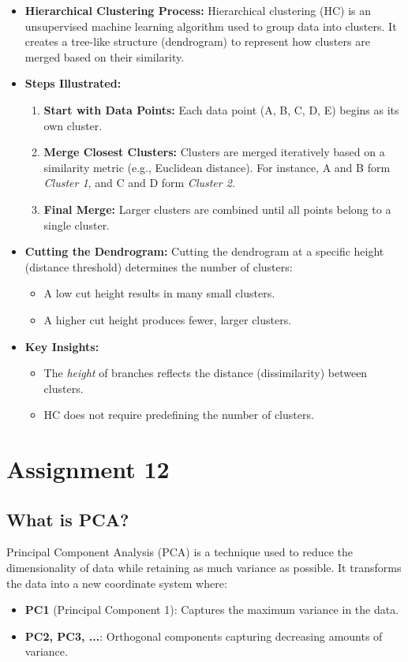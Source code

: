\documentclass{article}
\begin{document}
\begin{itemize}
    \item \textbf{Hierarchical Clustering Process:} 
    Hierarchical clustering (HC) is an unsupervised machine learning algorithm used to group data into clusters. It creates a tree-like structure (dendrogram) to represent how clusters are merged based on their similarity.

    \item \textbf{Steps Illustrated:}
    \begin{enumerate}
        \item \textbf{Start with Data Points:} Each data point (A, B, C, D, E) begins as its own cluster.
        \item \textbf{Merge Closest Clusters:} Clusters are merged iteratively based on a similarity metric (e.g., Euclidean distance). For instance, A and B form \textit{Cluster 1}, and C and D form \textit{Cluster 2}.
        \item \textbf{Final Merge:} Larger clusters are combined until all points belong to a single cluster.
    \end{enumerate}

    \item \textbf{Cutting the Dendrogram:} 
    Cutting the dendrogram at a specific height (distance threshold) determines the number of clusters:
    \begin{itemize}
        \item A low cut height results in many small clusters.
        \item A higher cut height produces fewer, larger clusters.
    \end{itemize}

    \item \textbf{Key Insights:}
    \begin{itemize}
        \item The \textit{height} of branches reflects the distance (dissimilarity) between clusters.
        \item HC does not require predefining the number of clusters.
    \end{itemize}
\end{itemize}

\newpage
\section{Assignment 12}

\subsection*{What is PCA?}
Principal Component Analysis (PCA) is a technique used to reduce the dimensionality of data while retaining as much variance as possible. It transforms the data into a new coordinate system where:
\begin{itemize}
    \item \textbf{PC1} (Principal Component 1): Captures the maximum variance in the data.
    \item \textbf{PC2, PC3, ...}: Orthogonal components capturing decreasing amounts of variance.
\end{itemize}
\end{document}
